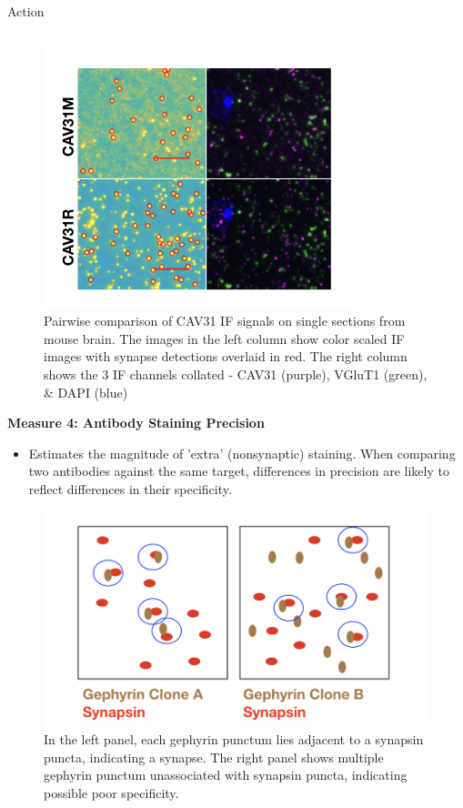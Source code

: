 \documentclass[final, table]{beamer}
\newlength{\onecolwid}
\newlength{\twocolwid}
\begin{document}
\begin{frame}[t]
\begin{columns}[t]
\begin{column}{\twocolwid}
\begin{block}{Action}
\begin{columns}[t]
\begin{column}{\onecolwid}
\begin{figure}
\centering
\includegraphics[width=0.8\textwidth]{figs/synapsedetection}
\caption{Pairwise comparison of CAV31 IF signals on single sections from mouse brain.  The images in the left column show color scaled IF images with synapse detections overlaid in red.  The right column shows the 3 IF channels collated - CAV31 (purple), VGluT1 (green), \& DAPI (blue)} 
\end{figure}


\textbf{Measure 4: Antibody Staining Precision} 

\begin{itemize} 
\item Estimates the magnitude of 'extra' (nonsynaptic) staining. When comparing two antibodies against the same target, differences in precision are likely to reflect differences in their specificity.  \end{itemize} 


\begin{figure}
\centering
\includegraphics[width=1\textwidth]{figs/ab_precision_cartoon}
\caption{In the left panel, each gephyrin punctum lies adjacent to a synapsin puncta, indicating a synapse.  The right panel shows multiple gephyrin punctum unassociated with synapsin puncta, indicating possible poor specificity. } 
\end{figure}



\end{column}
\end{columns}
\end{block}
\end{column}
\end{columns}
\end{frame}
\end{document}
